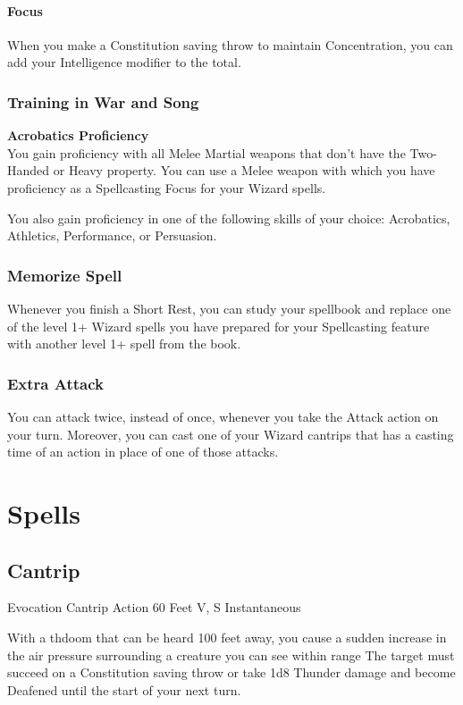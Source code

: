 \documentclass[letterpaper,openany,oneside,twocolumn]{book}
\begin{document}
\paragraph*{Focus} When you make a Constitution saving throw to maintain Concentration, you can add your Intelligence modifier to the total.
\subsubsection*{Training in War and Song}
\textbf{Acrobatics Proficiency}\\
You gain proficiency with all Melee Martial weapons that don't have the Two-Handed or Heavy property. You can use a Melee weapon with which you have proficiency as a Spellcasting Focus for your Wizard spells.

You also gain proficiency in one of the following skills of your choice: Acrobatics, Athletics, Performance, or Persuasion.
\subsubsection*{Memorize Spell}
Whenever you finish a Short Rest, you can study your spellbook and replace one of the level 1+ Wizard spells you have prepared for your Spellcasting feature with another level 1+ spell from the book.
\subsubsection*{Extra Attack}
You can attack twice, instead of once, whenever you take the Attack action on your turn. Moreover, you can cast one of your Wizard cantrips that has a casting time of an action in place of one of those attacks.

\section*{Spells}
\subsection*{Cantrip}
	{Evocation Cantrip}
	{Action}
	{60 Feet}
	{V, S}
	{Instantaneous}

With a thdoom that can be heard 100 feet away, you cause a sudden increase in the air pressure surrounding a creature you can see within range The target must succeed on a Constitution saving throw or take 1d8 Thunder damage and become Deafened until the start of your next turn.
\end{document}
